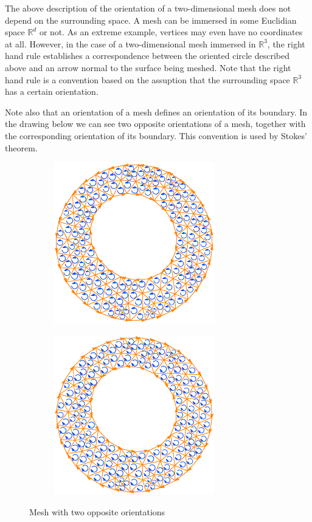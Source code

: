The above description of the orientation of a two-dimensional mesh does not depend
on the surrounding space.
A mesh can be immersed in some Euclidian space $ \mathbb{R}^d $ or not.
As an extreme example, vertices may even have no coordinates at all.
However, in the case of a two-dimensional mesh immersed in $ \mathbb{R}^3 $,
the right hand rule establishes a correspondence between the oriented circle described above
and an arrow normal to the surface being meshed.
Note that the right hand rule is a convention based on the assuption that
the surrounding space $ \mathbb{R}^3 $ has a certain orientation.

Note also that an orientation of a mesh defines an orientation of its boundary.
In the drawing below we can see two opposite orientations of a mesh, together with
the corresponding orientation of its boundary.
This convention is used by Stokes' theorem.

\begin{figure}[ht] \centering
\begin{subfigure}{71mm}\centering
  \includegraphics[width=70mm]{oriented-annulus-1}
\end{subfigure}  
\begin{subfigure}{71mm}\centering
  \includegraphics[width=70mm]{oriented-annulus-2}
\end{subfigure}  
  \caption{Mesh with two opposite orientations}
  \label{\numb section 1.\numb fig 4}
\end{figure}

